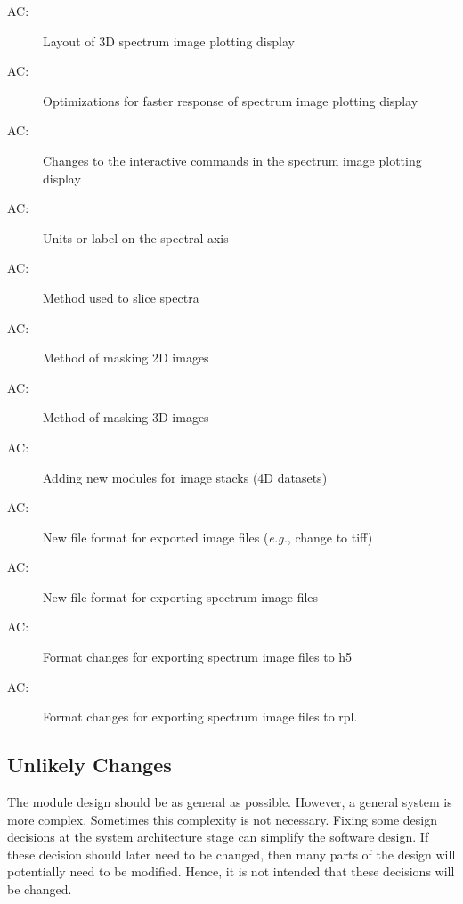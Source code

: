 \documentclass[12pt, titlepage]{article}
\newcounter{acnum}
\newcommand{\actheacnum}{AC\theacnum}
\begin{document}
\begin{description}
	\item[ \actheacnum \label{ac3DPlotLayout}:] Layout of 3D spectrum image plotting display
	\item[ \actheacnum \label{ac3DPlotOptimize}:] Optimizations for faster response of spectrum image plotting display
	\item[ \actheacnum \label{ac3DPlotCommands}:] Changes to the interactive commands in the spectrum image plotting display
	\item[ \actheacnum \label{acSpectrumUnits}:] Units or label on the spectral axis
	\item[ \actheacnum \label{ac1DSlice}:] Method used to slice spectra
	\item[ \actheacnum \label{ac2DMask}:] Method of masking 2D images
	\item[ \actheacnum \label{ac3DMask}:] Method of masking 3D images
	\item[ \actheacnum \label{ac4Dsupport}:] Adding new modules for image stacks (4D datasets)
	\item[ \actheacnum \label{acImageExportFormat}:] New file format for exported image files (\textit{e.g.}, change to tiff)
	\item[ \actheacnum \label{acSIExportFormat}:] New file format for exporting spectrum image files
	\item[ \actheacnum \label{acSIExportH5Format}:] Format changes for exporting spectrum image files to h5
	\item[ \actheacnum \label{acSIExportRPLFormat}:] Format changes for exporting spectrum image files to rpl.
\end{description}

\subsection{Unlikely Changes} \label{SecUchange}

The module design should be as general as possible. However, a general system is
more complex. Sometimes this complexity is not necessary. Fixing some design
decisions at the system architecture stage can simplify the software design. If
these decision should later need to be changed, then many parts of the design
will potentially need to be modified. Hence, it is not intended that these
decisions will be changed.
\end{document}
